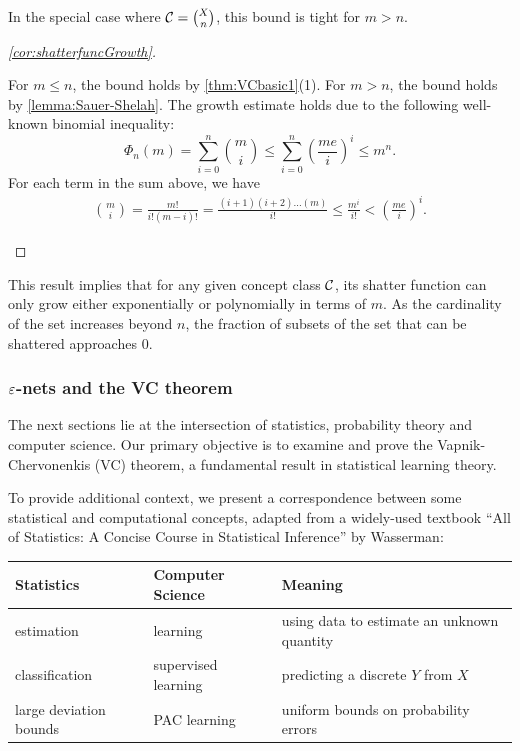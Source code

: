 \begin{remark}
    In the special case where $\mathcal{C} = \binom{X}{n}$, this bound is tight for $m>n$.
\end{remark}

\begin{proof}[\cref{cor:shatterfuncGrowth}]
~
\begin{outline}
    \1 For $m\leq n$, the bound holds by \cref{thm:VCbasic1}(1).
    \1 For $m>n$, the bound holds by \cref{lemma:Sauer-Shelah}.
    \1 The growth estimate holds due to the following well-known binomial inequality:
    $$\Phi_n(m) = \sum^n_{i=0}\binom{m}{i} \leq  \sum^n_{i=0}\left(\frac{me}{i}\right)^i \leq m^n.$$
    For each term in the sum above, we have
        \begin{align*}
            \binom{m}{i} = \frac{m!}{i! (m-i)!} = \frac{(i+1)(i+2)\ldots(m)}{i!} \leq \frac{m^i}{i!} < \left(\frac{me}{i}\right)^i.
        \end{align*}
\end{outline}
\end{proof}

This result implies that for any given concept class $\mathcal{C}$, its shatter function can only grow either exponentially or polynomially in terms of $m$. As the cardinality of the set increases beyond $n$, the fraction of subsets of the set that can be shattered approaches $0$.

\subsubsection{$\varepsilon$-nets and the VC theorem}
\label{subsection:2}

The next sections lie at the intersection of statistics, probability theory and computer science. Our primary objective is to examine and prove the Vapnik-Chervonenkis (VC) theorem, a fundamental result in statistical learning theory.

To provide additional context, we present a correspondence between some statistical and computational concepts, adapted from a widely-used textbook \enquote{All of Statistics: A Concise Course in Statistical Inference} by Wasserman:

\begin{center}
\begin{tabularx}{\textwidth}{X X X} 
Statistics & Computer Science & Meaning \\
\hline
estimation & learning & using data to estimate an unknown quantity \\
classification & supervised learning & predicting a discrete $Y$ from $X$\\
large deviation bounds & PAC learning & uniform bounds on probability errors
\end{tabularx}
\end{center}

